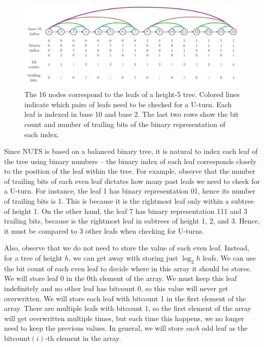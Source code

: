 \documentclass[12pt]{article}
\begin{document}
\begin{figure}[h]
\centering
\includegraphics[width=14cm]{illustrations/iterative_nuts_indexing.pdf}
\caption{The 16 nodes correspond to the leafs of a height-5 tree. Colored lines indicate which pairs of leafs need to be checked for a U-turn. Each leaf is indexed in base 10 and base 2. The last two rows show the bit count and number of trailing bits of the binary representation of each index.}
\label{fig_iterative_nuts_indexing}
\end{figure}

Since NUTS is based on a balanced binary tree, it is natural to index each leaf of the tree using binary numbers -- the binary index of each leaf corresponds closely to the position of the leaf within the tree. For example, observe that the number of trailing bits of each even leaf dictates how many past leafs we need to check for a U-turn. For instance, the leaf 1 has binary representation 01, hence its number of trailing bits is 1. This is because it is the rightmost leaf only within a subtree of height 1. On the other hand, the leaf 7 has binary representation 111 and 3 trailing bits, because is the rightmost leaf in subtrees of height 1, 2, and 3. Hence, it must be compared to 3 other leafs when checking for U-turns.

Also, observe that we do not need to store the value of each even leaf. Instead, for a tree of height $h$, we can get away with storing just $\log_2 h$ leafs. We can use the bit count of each even leaf to decide where in this array it should be stores. We will store leaf 0 in the 0th element of the array. We must keep this leaf indefinitely and no other leaf has bitcount 0, so this value will never get overwritten. We will store each leaf with bitcount 1 in the first element of the array. There are multiple leafs with bitcount 1, so the first element of the array will get overwritten multiple times, but each time this happens, we no longer need to keep the previous values. In general, we will store \textit{each} odd leaf as the $\text{bitcount}(i)$-th element in the array.
\end{document}
